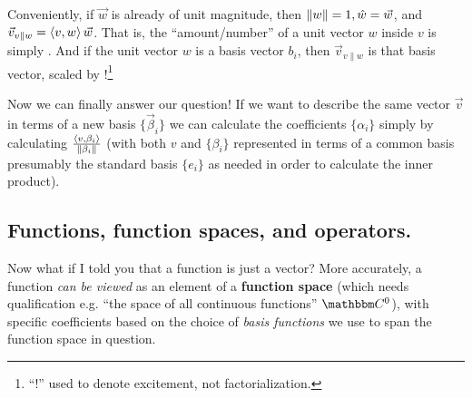 \documentclass[letterpaper,12pt]{report}
\begin{document}
Conveniently, if \(\vec{w}\) is already of unit magnitude, 
then \(\norm[w] = 1, \hat{w} = \vec{w}\), and
\(\vec{v}_{v\parallel w} = \innerprod[v][w]\vec{w}\).
That is, the ``amount/number'' of a 
unit vector \(w\) inside \(v\) is simply \innerprod[u][v].
And if the unit vector \(w\) is a basis vector \(b_i\), then 
\(\vec{v}_{v\parallel w}\) is 
that basis vector, scaled by \innerprod[v][b_i]!\footnote{
  ``!'' used to denote excitement, not factorialization.
}
\par

Now we can finally answer our question! 
If we want to describe the same vector \(\vec{v}\)
in terms of a new basis \(\{\vec{\beta}_i\}\) 
we can calculate the coefficients \(\{\alpha_i\}\)
simply by calculating \(\frac{\innerprod[v][\beta_i]}{\norm[\beta_i]}\)
(with both \(v\) and \(\{\beta_i\}\) represented
in terms of a common basis
\textemdash{} presumably the standard basis \(\{e_i\}\) \textemdash{}
as needed in order to calculate the inner product).

\subsection{Functions, function spaces, and operators.}

Now what if I told you that a function is just a vector?
More accurately, a function \emph{can be viewed}
as an element of a \textbf{function space} (which needs qualification \textemdash{}
e.g. ``the space of all continuous functions'' \(\domain{C}^0\)), 
with specific coefficients
based on the choice of \emph{basis functions} we use to span the function space in question.



\end{document}
